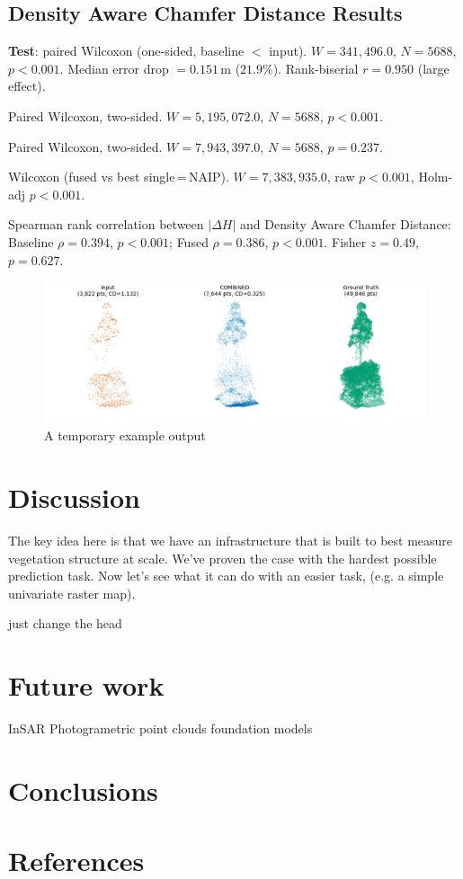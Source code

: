 \documentclass[preprint,12pt,authoryear]{elsarticle}
\begin{document}
\subsection{Density Aware Chamfer Distance Results}
{\bfseries Test}: paired Wilcoxon (one-sided, baseline $<$ input).  
$W=341,496.0$, $N=5688$, $p<0.001$.  Median error drop $=0.151\,\text{m}$ ($21.9\%$).  
Rank-biserial $r=0.950$ (large effect).

Paired Wilcoxon, two-sided.  $W=5,195,072.0$, $N=5688$, $p<0.001$.  

Paired Wilcoxon, two-sided.  $W=7,943,397.0$, $N=5688$, $p=0.237$.  

Wilcoxon (fused vs best single\,=\,NAIP).  $W=7,383,935.0$, raw $p<0.001$, Holm-adj $p<0.001$.  

Spearman rank correlation between $|\Delta H|$ and Density Aware Chamfer Distance:  
Baseline $\rho=0.394$, $p<0.001$; Fused $\rho=0.386$, $p<0.001$.  
Fisher $z=0.49$, $p=0.627$.

\begin{figure}
    \centering
    \includegraphics[width=.8\linewidth]{manuscript//figures/output_example.png}
    \caption{A temporary example output}
    \label{fig:output_example}
\end{figure}


\section{Discussion}
The key idea here is that we have an infrastructure that is built to best measure vegetation structure at scale. We've proven the case with the hardest possible prediction task. Now let's see what it can do with an easier task, (e.g. a simple univariate raster map).

just change the head


\section{Future work}
InSAR
Photogrametric point clouds
foundation models


\section{Conclusions}



\section*{References}


\end{document}
